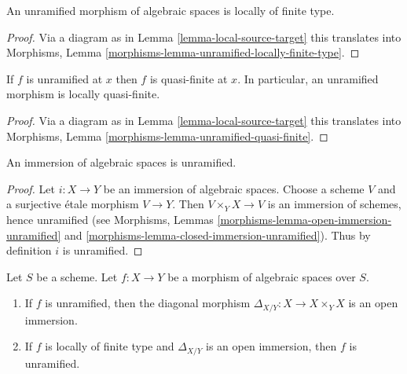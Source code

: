 \begin{lemma}
\label{lemma-unramified-locally-finite-type}
An unramified morphism of algebraic spaces is locally of finite type.
\end{lemma}

\begin{proof}
Via a diagram as in
Lemma \ref{lemma-local-source-target}
this translates into
Morphisms, Lemma \ref{morphisms-lemma-unramified-locally-finite-type}.
\end{proof}

\begin{lemma}
\label{lemma-unramified-quasi-finite}
If $f$ is unramified at $x$ then $f$ is quasi-finite at $x$.
In particular, an unramified morphism is locally quasi-finite.
\end{lemma}

\begin{proof}
Via a diagram as in
Lemma \ref{lemma-local-source-target}
this translates into
Morphisms, Lemma \ref{morphisms-lemma-unramified-quasi-finite}.
\end{proof}

\begin{lemma}
\label{lemma-immersion-unramified}
An immersion of algebraic spaces is unramified.
\end{lemma}

\begin{proof}
Let $i : X \to Y$ be an immersion of algebraic spaces. Choose a scheme
$V$ and a surjective \'etale morphism $V \to Y$. Then $V \times_Y X \to V$
is an immersion of schemes, hence unramified (see
Morphisms, Lemmas \ref{morphisms-lemma-open-immersion-unramified} and
\ref{morphisms-lemma-closed-immersion-unramified}).
Thus by definition $i$ is unramified.
\end{proof}

\begin{lemma}
\label{lemma-diagonal-unramified-morphism}
Let $S$ be a scheme.
Let $f : X \to Y$ be a morphism of algebraic spaces over $S$.
\begin{enumerate}
\item If $f$ is unramified, then the diagonal morphism
$\Delta_{X/Y} : X \to X \times_Y X$ is an open immersion.
\item If $f$ is locally of finite type
and $\Delta_{X/Y}$ is an open immersion, then $f$ is unramified.
\end{enumerate}
\end{lemma}

